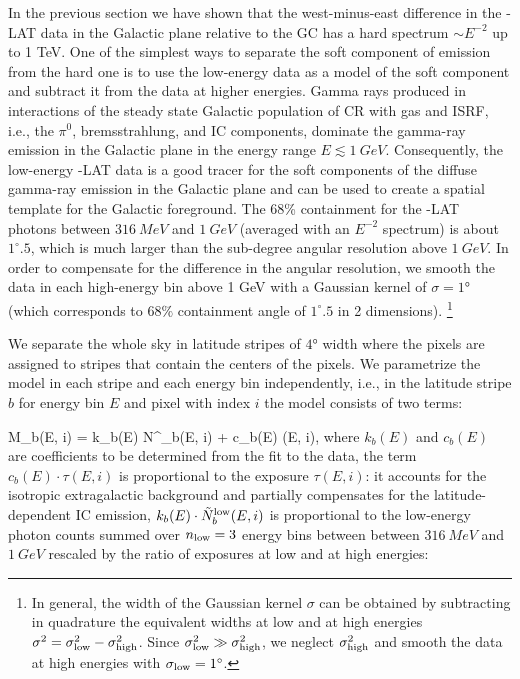 In the previous section we have shown that the west-minus-east difference in the \Fermi-LAT data in the Galactic plane relative to the GC has a hard 
spectrum $\sim E^{-2}$ up to 1 TeV.
One of the simplest ways to separate the soft component of emission from the hard one is to use the low-energy data as
a model of the soft component and subtract it from the data at higher energies.
Gamma rays produced in interactions of the steady state Galactic population of CR with gas and ISRF,
i.e., the $\pi^0$, bremsstrahlung, and IC components,
dominate the gamma-ray emission in the Galactic plane in the energy range $E \lesssim \SI{1}{GeV}$. 
Consequently, the low-energy \Fermi-LAT data is a good tracer for the soft components of the
diffuse gamma-ray emission in the Galactic plane and can be used to create a spatial template for the Galactic foreground.
The 68\% containment for the \Fermi-LAT photons between $\SI{316}{MeV}$ and $\SI{1}{GeV}$ (averaged with an $E^{-2}$ spectrum) is about $1^\circ\!\!.5$,
which is much larger than the sub-degree angular resolution above $\SI{1}{GeV}$.
In order to compensate for the difference in the angular resolution, 
we smooth the data in each high-energy bin above 1 GeV
with a Gaussian kernel of $\sigma = \ang{1}$ (which corresponds to $68\%$ containment angle of
$1^\circ\!\!.5$ in 2 dimensions).%
\footnote{In general, the width of the Gaussian kernel $\sigma$ can be obtained by subtracting in quadrature
the equivalent widths at low and at high energies $\sigma^2 = \sigma_{\rm low}^2 - \sigma_{\rm high}^2$.
Since $\sigma_{\rm low}^2 \gg \sigma_{\rm high}^2$, we neglect $\sigma_{\rm high}^2$ and smooth the 
data at high energies with $\sigma_{\rm low} = 1^\circ$.}

We separate the whole sky in latitude stripes of $\ang{4}$ width where the \Healpix pixels are assigned to stripes that contain the centers of the pixels.
We parametrize the model in each stripe and each energy bin independently, i.e., 
in the latitude stripe $b$ for energy bin $E$ and \Healpix pixel with index $i$ the model consists of two terms:

\be
{}
M_{b}(E, i) = k_{b}(E) \cdot \tilde N^\low_{b}(E, i) + c_b(E) \cdot \tau(E, i),
\ee
where $k_{b}(E)$ and $c_b(E)$ are coefficients to be determined from the fit to the data,
the term $c_b(E) \cdot \tau(E, i)$ is proportional to the exposure $\tau(E, i)$: it accounts for the isotropic extragalactic background and partially compensates for 
the latitude-dependent IC emission,
$k_{b}(E) \cdot \tilde N^{\text{low}}_b(E, i)$ is proportional to the low-energy photon counts summed over 
$n_{\text{low}} = 3$ energy bins between between $\SI{316}{MeV}$ and $\SI{1}{GeV}$ 
rescaled by the ratio of exposures at low and at high energies:

